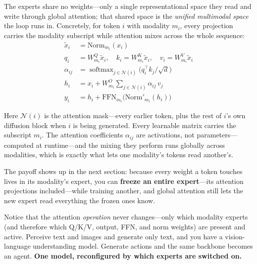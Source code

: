 \documentclass[10pt,conference]{IEEEtran}
\begin{document}
The experts share no weights---only a single representational space they read and
write through global attention; that shared space is the \emph{unified multimodal
space} the loop runs in. Concretely, for token $i$ with modality $m_i$, every
projection carries the modality subscript while attention mixes across the whole
sequence:
\begin{equation}
\begin{aligned}
\tilde{x}_i &= \mathrm{Norm}_{m_i}(x_i) \\[2pt]
q_i &= W^{Q}_{m_i}\tilde{x}_i, \quad k_i = W^{K}_{m_i}\tilde{x}_i, \quad v_i = W^{V}_{m_i}\tilde{x}_i \\[4pt]
\alpha_{ij} &= \operatorname{softmax}_{j\in\mathcal{N}(i)}\!\big(q_i^{\top}k_j/\sqrt{d}\big) \\[4pt]
h_i &= x_i + W^{O}_{m_i}\textstyle\sum_{j\in\mathcal{N}(i)}\alpha_{ij}\,v_j \\[4pt]
y_i &= h_i + \mathrm{FFN}_{m_i}\!\big(\mathrm{Norm}'_{m_i}(h_i)\big)
\end{aligned}
\end{equation}

Here $\mathcal{N}(i)$ is the attention mask---every earlier token, plus the rest
of $i$'s own diffusion block when $i$ is being generated. Every learnable matrix
carries the subscript $m_i$. The attention coefficients
$\alpha_{ij}$ are activations, not parameters---computed at runtime---and the
mixing they perform runs globally across modalities, which is exactly what lets
one modality's tokens read another's.

The payoff shows up in the next section: because every weight a token touches
lives in its modality's expert, you can \textbf{freeze an entire expert}---its
attention projections included---while training another, and global attention
still lets the new expert read everything the frozen ones know.

Notice that the attention \emph{operation} never changes---only which modality
experts (and therefore which Q/K/V, output, FFN, and norm weights) are present
and active. Perceive text and images and generate only text, and you have a
vision-language understanding model. Generate actions and the same backbone
becomes an agent.
\textbf{One model, reconfigured by which experts are switched on.}
\end{document}
